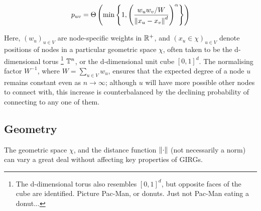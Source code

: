 
\begin{equation}
    p_{uv} = \Theta \left ( \min \left \{
        1,
        \left (
            \frac{w_u w_v / W}{\left\lVert x_u - x_v\right\rVert^d}
        \right )^\alpha
    \right \}
    \right )
\end{equation}

Here, $(w_u)_{u \in V}$ are node-specific weights in $\mathbb{R}^+$, and $(x_u \in \chi)_{u \in V}$ denote positions of nodes in a particular geometric space $\chi$, often taken to be the d-dimensional torus
\footnote{The d-dimensional torus also resembles $[0, 1]^d$, but opposite faces of the cube are identified. Picture Pac-Man, or donuts. Just not Pac-Man eating a donut...}
$\mathbb{T}^n$, or the d-dimensional unit cube $[0, 1]^d$.
The normalising factor $W^{-1}$, where $W = \sum_{u \in V} w_u$, ensures that the expected degree of a node $u$ remains constant even as $n \to \infty$; although $u$ will have more possible other nodes to connect with, this increase is counterbalanced by the declining probability of connecting to any one of them.





\subsection{Geometry}
The geometric space $\chi$, and the distance function $\left\lVert \cdot\right\rVert$ (not necessarily a norm) can vary a great deal without affecting key properties of GIRGs.

